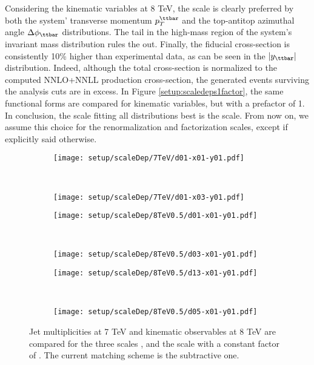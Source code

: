 \documentclass[PUB, UKenglish, texlive=2016]{\ATLASLATEXPATH atlasdoc}
\begin{document}
Considering the kinematic variables at 8 TeV, the \HalfETScale scale is clearly preferred by both the \ttbar system' transverse momentum $p_T^{\ttbar}$ and the top-antitop azimuthal angle $\Delta \phi_{\ttbar}$ distributions. The tail in the high-mass region of the \ttbar system's invariant mass distribution rules the \TopPairMassScale out. Finally, the fiducial cross-section is consistently 10\% higher than experimental data, as can be seen in the $|y_{\ttbar}|$ distribution. Indeed, although the total cross-section is normalized to the computed NNLO+NNLL \ttbar production cross-section, the generated events surviving the analysis cuts are in excess. In Figure \ref{setup:scaledeps1factor}, the same functional forms are compared for kinematic variables, but with a prefactor of 1. In conclusion, the scale fitting all distributions best is the \HalfETScale scale. From now on, we assume this choice for the renormalization and factorization scales, except if explicitly said otherwise.

\begin{figure}
\centering
	\begin{subfigure}[b]{0.4\textwidth}
	\texttt{[image: setup/scaleDep/7TeV/d01-x01-y01.pdf]}
	\end{subfigure} 
	~
	\begin{subfigure}[b]{0.4\textwidth}
	\texttt{[image: setup/scaleDep/7TeV/d01-x03-y01.pdf]}
	\end{subfigure}
	
	\begin{subfigure}[b]{0.4\textwidth}
	\texttt{[image: setup/scaleDep/8TeV0.5/d01-x01-y01.pdf]}
	\end{subfigure}
	~
	\begin{subfigure}[b]{0.4\textwidth}
	\texttt{[image: setup/scaleDep/8TeV0.5/d03-x01-y01.pdf]}
	\end{subfigure}
	
	\begin{subfigure}[b]{0.4\textwidth}
	\texttt{[image: setup/scaleDep/8TeV0.5/d13-x01-y01.pdf]}
	\end{subfigure}
	~
	\begin{subfigure}[b]{0.4\textwidth}
	\texttt{[image: setup/scaleDep/8TeV0.5/d05-x01-y01.pdf]}
	\end{subfigure}
	\caption{Jet multiplicities at 7 TeV and kinematic observables at 8 TeV are compared for the three scales \TopPairMassScale, \TopMTScale and the \ETScale scale with a constant factor of . The current matching scheme is the subtractive one.}
	\label{setup:scaledeps}
\end{figure}
\end{document}

